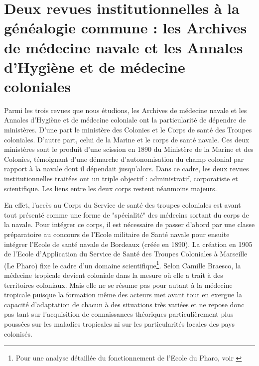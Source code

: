 \section{Deux revues institutionnelles à la généalogie commune : les Archives de médecine navale et les Annales d'Hygiène et de médecine coloniales}

Parmi les trois revues que nous étudions, les Archives de médecine navale et les Annales d'Hygiène et de médecine coloniale ont la particularité de dépendre de ministères. D’une part le ministère des Colonies et le Corps de santé des Troupes coloniales. D’autre part, celui de la Marine et le corps de santé navale. 
Ces deux ministères sont le produit d'une scission en 1890 du Ministère de la Marine et des Colonies, témoignant d'une démarche d'autonomisation du champ colonial par rapport à la navale dont il dépendait jusqu'alors. Dans ce cadre, les deux revues institutionnelles traitées ont un triple objectif : administratif, corporatiste et scientifique. Les liens entre les deux corps restent néanmoins majeurs. 


En effet, l'accès au Corps du Service de santé des troupes coloniales est avant tout présenté comme une forme de "spécialité" des médecins sortant du corps de la navale. Pour intégrer ce corps, il est nécessaire de passer d'abord par une classe préparatoire au concours de l'Ecole militaire de Santé navale pour ensuite intégrer l'Ecole de santé navale de Bordeaux (créée en 1890). La création en 1905 de l'Ecole d'Application du Service de Santé des Troupes Coloniales à Marseille (Le Pharo) fixe le cadre d'un domaine scientifique\footnote{Pour une analyse détaillée du fonctionnement de l'Ecole du Pharo, voir \cite{braesco_former_2017}}. Selon Camille Braesco, la médecine tropicale devient coloniale dans la mesure où elle a trait à des territoires coloniaux. Mais elle ne se résume pas pour autant à la médecine tropicale puisque la formation même des acteurs met avant tout en exergue la capacité d'adaptation de chacun à des situations très variées et ne repose donc pas tant sur l'acquisition de connaissances théoriques particulièrement plus poussées sur les maladies tropicales ni sur les particularités locales des pays colonisés.



